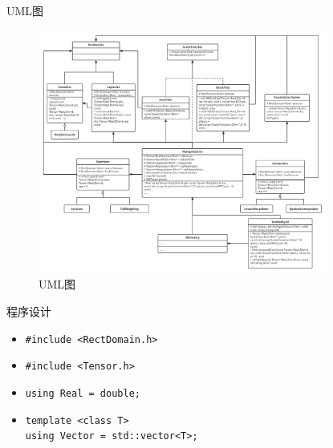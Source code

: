 \documentclass{beamer}
\begin{document}
\begin{frame}{UML图}
  \begin{figure}[!htp]                                                                       
  \centering                                                                           
  \includegraphics[width=9.5cm]{Multigrid2.png}                                           
  \caption{UML图}                        
\end{figure}

\end{frame}

\begin{frame}{程序设计}
\begin{itemize}
\item \texttt{\#include <RectDomain.h>}
\item \texttt{\#include <Tensor.h>}
\item \texttt{using Real = double;}
\item \texttt{template <class T>\\ using Vector = std::vector<T>;}  
\end{itemize}
                 
\end{frame}
\end{document}

